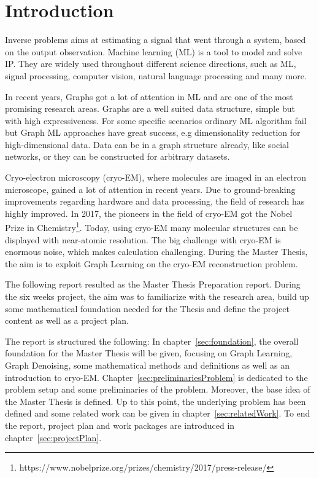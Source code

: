 \chapter{Introduction}
\label{sec:introduction}

Inverse problems aims at estimating a signal that went through a system, based on the output observation.
Machine learning (ML) is a tool to model and solve IP.
They are widely used throughout different science directions, such as ML,
signal processing, computer vision, natural language processing and many more.

In recent years, Graphs got a lot of attention in ML and are one of the most promising research areas.
Graphs are a well suited data structure, simple but with high expressiveness. 
For some specific scenarios ordinary ML algorithm fail but Graph ML approaches have great success, e.g dimensionality reduction for high-dimensional data.
Data can be in a graph structure already, like social networks, or they can be constructed for arbitrary datasets.

Cryo-electron microscopy (cryo-EM), where molecules are imaged in an electron microscope,
gained a lot of attention in recent years. 
Due to ground-breaking improvements regarding hardware and data processing, the field of research
has highly improved. In 2017, the pioneers in the field of cryo-EM got the 
Nobel Prize in Chemistry\footnote{https://www.nobelprize.org/prizes/chemistry/2017/press-release/}.
Today, using cryo-EM many molecular structures can be displayed with near-atomic resolution.
The big challenge with cryo-EM is enormous noise, which makes calculation challenging. 
During the Master Thesis, the aim is to exploit Graph Learning on the cryo-EM reconstruction problem.

\bigskip

The following report resulted as the Master Thesis Preparation report. During the six weeks project, 
the aim was to familiarize with the research area, build up some mathematical foundation needed 
for the Thesis and define the project content as well as a project plan.

\bigskip

The report is structured the following:
In chapter~\ref{sec:foundation}, the overall foundation for the Master Thesis will be given, focusing 
on Graph Learning, Graph Denoising, some mathematical methods and definitions as well as an 
introduction to cryo-EM.
Chapter~\ref{sec:preliminariesProblem} is dedicated to the problem setup and some preliminaries of the problem. 
Moreover, the base idea of the Master Thesis is defined.
Up to this point, the underlying problem has been defined and some related work can be given in chapter~\ref{sec:relatedWork}.
To end the report, project plan and work packages are introduced in chapter~\ref{sec:projectPlan}.
